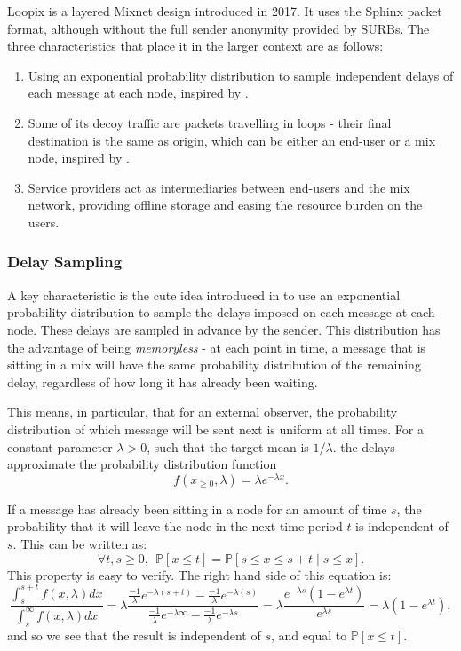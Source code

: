\documentclass{article}
\begin{document}
Loopix  is a layered Mixnet design introduced in 2017. It uses the Sphinx packet format, although without the full sender anonymity provided by SURBs. The three characteristics that place it in the larger context are as follows:
\begin{enumerate}
\item Using an exponential probability distribution to sample independent delays of each message at each node, inspired by .
\item Some of its decoy traffic are packets travelling in loops - their final destination is the same as origin, which can be either an end-user or a mix node, inspired by \cite{heartbeat}.
\item Service providers act as intermediaries between end-users and the mix network, providing offline storage and easing the resource burden on the users.
\end{enumerate}


\subsubsection{Delay Sampling} A key characteristic is the cute idea introduced in   to use an exponential probability distribution to sample the delays imposed on each message at each node. These delays are sampled in advance by the sender. This distribution has the advantage of being \textit{memoryless} - at each point in time, a message that is sitting in a mix will have the same probability distribution of the remaining delay, regardless of how long it has already been waiting. 

\pagebreak
\noindent This means, in particular, that for an external observer, the probability distribution of which message will be sent next is uniform at all times. For a constant parameter $\lambda >0$, such that the target mean is $1/\lambda$. the delays approximate the probability distribution function $$f(x_{\geq 0},\lambda)=\lambda e^{-\lambda x} .$$

\noindent If a message has already been sitting in a node for an amount of time $s$, the probability that it will leave the node in the next time period $t$ is independent of $s$. This can be written as: $$\forall  t,s \geq 0,\ \ \mathbb{P}[x\leq t] = \mathbb{P}[s\leq x\leq s+t\mid s\leq x].$$ This property is easy to verify. The right hand side of this equation is: $$\frac{\int_s^{s+t} f(x,\lambda)dx}{\int_s^\infty f(x,\lambda)dx}= \lambda\frac{\frac{-1}{\lambda}e^{-\lambda(s+t)}-\frac{-1}{\lambda}e^{-\lambda(s)}}{\frac{-1}{\lambda}e^{-\lambda\infty}-\frac{-1}{\lambda}e^{-\lambda s}}=\lambda\frac{e^{-\lambda s}(1-e^{\lambda t})}{e^{\lambda s}}=\lambda (1-e^{\lambda t}), $$ and so we see that the result is independent of $s$, and equal to $\mathbb{P}[x\leq t]$. 
\end{document}

